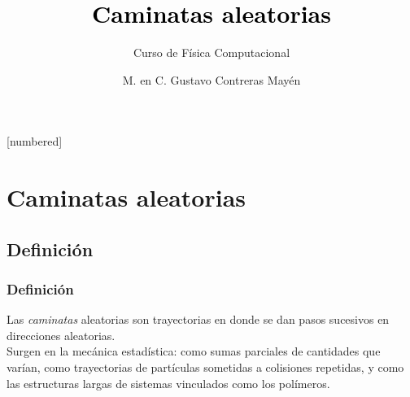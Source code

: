 



\normalfont
\usepackage{ccfonts}%
\usepackage[T1]{fontenc}%
\renewcommand{\rmdefault}{cmr}%
\linespread{1.3}
\title{\textcolor{black}{Caminatas aleatorias}}
\subtitle{Curso de Física Computacional}
\author[]{M. en C. Gustavo Contreras Mayén}
[numbered]

\newcommand{\localtextbulletone}{\textcolor{gray}{\raisebox{.45ex}{\rule{.6ex}{.6ex}}}}
\maketitle
\fontsize{14}{14}\selectfont
{}
\section{Caminatas aleatorias}
\subsection{Definición}
\begin{frame}
\frametitle{Definición}
Las \emph{caminatas} aleatorias son trayectorias en donde se dan pasos sucesivos en direcciones aleatorias.
\\
\bigskip
\pause
Surgen en la mecánica estadística: como sumas parciales de cantidades que varían, como trayectorias de partículas sometidas a colisiones repetidas, y como las estructuras largas de sistemas vinculados como los polímeros.
\end{frame}
